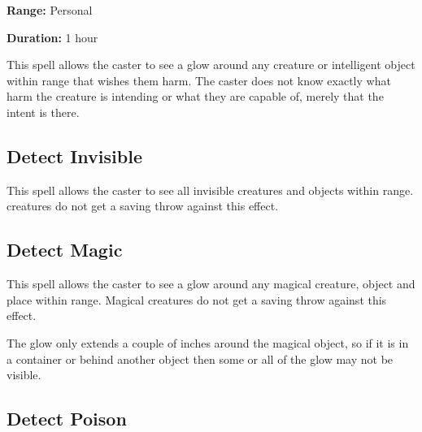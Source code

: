 \begin{multicols*}{2}
{\textbf{Range:} Personal

\textbf{Duration:} 1 hour}

This spell allows the caster to see a glow around any creature or intelligent object within range that wishes them harm. The caster does not know exactly what harm the creature is intending or what they are capable of, merely that the intent is there.

\subsection{Detect Invisible}\label{spell:Detect Invisible}

This spell allows the caster to see all invisible creatures and objects within range.  creatures do not get a saving throw against this effect.

\subsection{Detect Magic}\label{spell:Detect Magic}

This spell allows the caster to see a glow around any magical creature, object and place within range. Magical creatures do not get a saving throw against this effect.

The glow only extends a couple of inches around the magical object, so if it is in a container or behind another object then some or all of the glow may not be visible.

\subsection{Detect Poison}\label{spell:Detect Poison}
\end{multicols*}
